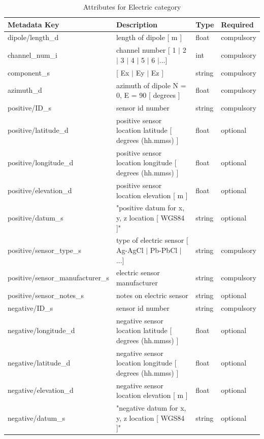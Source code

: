 \documentclass{article}
\begin{document}
\begin{table}[htb!]
	\caption[Attributes for Electric Channel]{Attributes for Electric category}
	\begin{tabular}{|l|p{3in}|l|l|}
		\hline
		\textbf{Metadata Key} & \textbf{Description} & \textbf{Type} & \textbf{Required} \\ \hline
		dipole/length\_d & length of dipole [ m ] & float & compulsory \\ \hline
		channel\_num\_i & channel number [ 1 $|$ 2 $|$ 3 $|$ 4 $|$ 5 $|$ 6 $|$...] & int & compulsory \\ \hline
		component\_s & [ Ex $|$ Ey $|$ Ez ] & string  & compulsory \\ \hline
		azimuth\_d & azimuth of dipole N = 0,  E = 90 [ degrees ] & float & compulsory \\ \hline
		positive/ID\_s & sensor id number & string & compulsory \\ \hline
		positive/latitude\_d & positive sensor location latitude [ degrees (hh.mmss) ] & float & optional \\ \hline
		positive/longitude\_d & positive sensor location longitude [ degrees (hh.mmss) ] & float & optional \\ \hline
		positive/elevation\_d & positive sensor location elevation [ m ] & float & optional \\ \hline
		positive/datum\_s & "positive datum for x, y, z location [ WGS84 ]" & string & optional \\ \hline
		positive/sensor\_type\_s & type of electric sensor [ Ag-AgCl $|$ Pb-PbCl $|$ ...] & string & compulsory \\ \hline
		positive/sensor\_manufacturer\_s & electric sensor manufacturer & string & compulsory \\ \hline
		positive/sensor\_notes\_s & notes on electric sensor & string & optional \\ \hline
		negative/ID\_s & sensor id number & string & compulsory \\ \hline
		negative/longitude\_d & negative sensor location latitude [ degrees (hh.mmss) ] & float & optional \\ \hline
		negative/latitude\_d & negative sensor location longitude [ degrees (hh.mmss) ] & float & optional \\ \hline
		negative/elevation\_d & negative sensor location elevation [ m ] & float & optional \\ \hline
		negative/datum\_s & "negative datum for x, y, z location [ WGS84 ]" & string & optional \\ \hline

\end{tabular}
\end{table}
\end{document}
